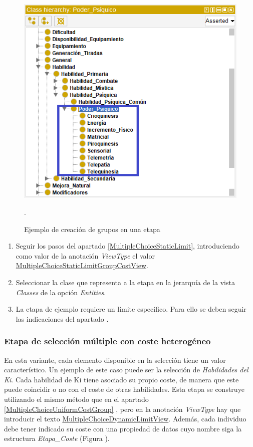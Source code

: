 \begin{figure}[H]
    \centering
    \includegraphics[scale=0.6]{Figures/Protege/Groups.png}
    \caption{Ejemplo de creación de grupos en una etapa}.
    \label{Groups}
\end{figure}

\begin{enumerate}
    \item Seguir los pasos del apartado \ref*{MultipleChoiceStaticLimit}, introduciendo como valor de la anotación \textit{ViewType}
    el valor \underline{MultipleChoiceStaticLimitGroupCostView}.
    \item Seleccionar la clase que representa a la etapa en la jerarquía de la vista \textit{Classes} de la opción \textit{Entities}.
    \item La etapa de ejemplo requiere un límite específico. Para ello se deben seguir las indicaciones del 
    apartado .
\end{enumerate}

\subsubsection{Etapa de selección múltiple con coste heterogéneo}
En esta variante, cada elemento disponible en la selección tiene un valor característico. Un ejemplo de este caso puede ser la 
selección de \textit{Habilidades del Ki}. Cada habilidad de Ki tiene asociado su propio coste, de manera que este puede coincidir 
o no con el coste de otras habilidades. \newpage Esta etapa se construye utilizando el mismo método que en el apartado \ref*{MultipleChoiceUniformCostGroup}
, pero en la anotación \textit{ViewType} hay que introducir el texto \underline{MultipleChoiceDynamicLimitView}. Además, cada individuo 
debe tener indicado su coste con una propiedad de datos cuyo nombre siga la estructura \textit{Etapa\_Coste} (Figura ).


